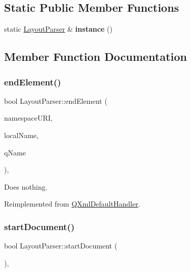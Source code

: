 \subsection*{Static Public Member Functions}
\begin{DoxyCompactItemize}
\item 
\mbox{\label{class_layout_parser_a15418df161dd0e336bf07663382f787a}} 
static \mbox{\hyperlink{class_layout_parser}{Layout\+Parser}} \& {\bfseries instance} ()
\end{DoxyCompactItemize}


\subsection{Member Function Documentation}
\mbox{\label{class_layout_parser_aded617e52b2a221ed57c29ac79da360b}} 
\subsubsection{\texorpdfstring{endElement()}{endElement()}}
{\footnotesize\ttfamily bool Layout\+Parser\+::end\+Element (\begin{DoxyParamCaption}\item[{const \mbox{\hyperlink{class_q_string}{Q\+String}} \&}]{namespace\+U\+RI,  }\item[{const \mbox{\hyperlink{class_q_string}{Q\+String}} \&}]{local\+Name,  }\item[{const \mbox{\hyperlink{class_q_string}{Q\+String}} \&}]{q\+Name }\end{DoxyParamCaption})\hspace{0.3cm}{\ttfamily [inline]}, {\ttfamily [virtual]}}

Does nothing. 

Reimplemented from \mbox{\hyperlink{class_q_xml_default_handler_ae5d92a2fbae15a793aedf725b62b16c2}{Q\+Xml\+Default\+Handler}}.

\mbox{\label{class_layout_parser_a69ed2ff63a31f160e166ff79c93f5865}} 
\subsubsection{\texorpdfstring{startDocument()}{startDocument()}}
{\footnotesize\ttfamily bool Layout\+Parser\+::start\+Document (\begin{DoxyParamCaption}{ }\end{DoxyParamCaption})\hspace{0.3cm}{\ttfamily [inline]}, {\ttfamily [virtual]}}

